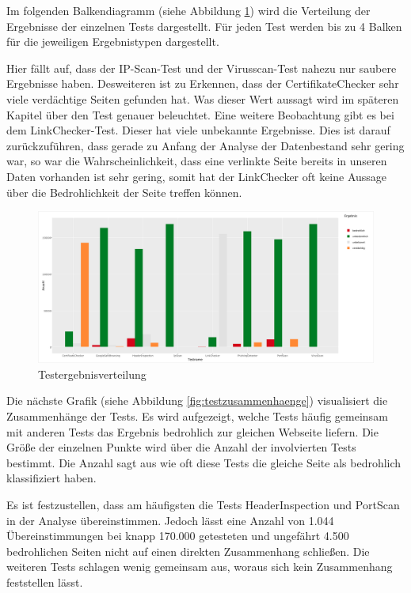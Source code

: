 Im folgenden Balkendiagramm (siehe Abbildung \ref{fig:ergebnisverteilung}) wird die Verteilung der Ergebnisse der einzelnen Tests dargestellt. Für jeden Test werden bis zu 4 Balken für die jeweiligen Ergebnistypen dargestellt.

Hier fällt auf, dass der IP-Scan-Test und der Virusscan-Test nahezu nur saubere Ergebnisse haben. Desweiteren ist zu Erkennen, dass der CertifikateChecker sehr viele verdächtige Seiten gefunden hat. Was dieser Wert aussagt wird im späteren Kapitel über den Test genauer beleuchtet. Eine weitere Beobachtung gibt es bei dem LinkChecker-Test. Dieser hat viele unbekannte Ergebnisse. Dies ist darauf zurückzuführen, dass gerade zu Anfang der Analyse der Datenbestand sehr gering war, so war die Wahrscheinlichkeit, dass eine verlinkte Seite bereits in unseren Daten vorhanden ist sehr gering, somit hat der LinkChecker oft keine Aussage über die Bedrohlichkeit der Seite treffen können.
\begin{figure}[H]
  \centering
  \includegraphics[width=15cm]{images/stats/ergebnisverteilung}
  \caption{Testergebnisverteilung}
  \label{fig:ergebnisverteilung}
\end{figure}

Die nächste Grafik (siehe Abbildung \ref{fig:testzusammenhaenge}) visualisiert die Zusammenhänge der Tests. Es wird aufgezeigt, welche Tests häufig gemeinsam mit anderen Tests das Ergebnis bedrohlich zur gleichen Webseite liefern. Die Größe der einzelnen Punkte wird über die Anzahl der involvierten Tests bestimmt. Die Anzahl sagt aus wie oft diese Tests die gleiche Seite als bedrohlich klassifiziert haben.

Es ist festzustellen, dass am häufigsten die Tests HeaderInspection und PortScan in der Analyse übereinstimmen. Jedoch lässt eine Anzahl von 1.044 Übereinstimmungen bei knapp 170.000 getesteten und ungefährt 4.500 bedrohlichen Seiten nicht auf einen direkten Zusammenhang schließen. Die weiteren Tests schlagen wenig gemeinsam aus, woraus sich kein Zusammenhang feststellen lässt.

